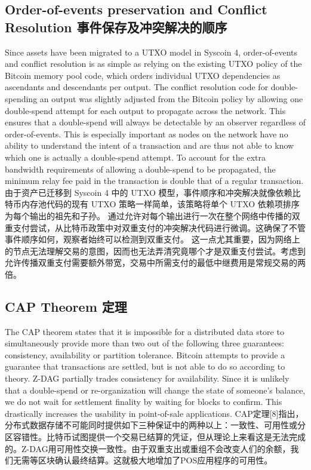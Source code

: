 \documentclass{ctexart}
\begin{document}
\subsection{Order-of-events preservation and Conflict Resolution 事件保存及冲突解决的顺序}
Since assets have been migrated to a UTXO model in Syscoin 4, order-of-events and conflict resolution is as simple as relying on the existing UTXO policy of the Bitcoin memory pool code, which orders individual UTXO dependencies as ascendants and descendants per output. The conflict resolution code for double-spending an output was slightly adjusted from the Bitcoin policy by allowing one double-spend attempt for each output to propagate across the network. This ensures that a double-spend will always be detectable by an observer regardless of order-of-events. This is especially important as nodes on the network have no ability to understand the intent of a transaction and are thus not able to know which one is actually a double-spend attempt. To account for the extra bandwidth requirements of allowing a double-spend to be propagated, the minimum relay fee paid in the transaction is double that of a regular transaction. 由于资产已迁移到 Syscoin 4 中的 UTXO 模型，事件顺序和冲突解决就像依赖比特币内存池代码的现有 UTXO 策略一样简单，该策略将单个 UTXO 依赖项排序为每个输出的祖先和子孙。 通过允许对每个输出进行一次在整个网络中传播的双重支付尝试，从比特币政策中对双重支付的冲突解决代码进行微调。这确保了不管事件顺序如何，观察者始终可以检测到双重支付。 这一点尤其重要，因为网络上的节点无法理解交易的意图，因而也无法弄清究竟哪个才是双重支付尝试。考虑到允许传播双重支付需要额外带宽，交易中所需支付的最低中继费用是常规交易的两倍。

\subsection{CAP Theorem 定理}
The CAP theorem \cite{Bre12} states that it is impossible for a distributed data store to simultaneously provide more than two out of the following three guarantees: consistency, availability or partition tolerance. Bitcoin attempts to provide a guarantee that transactions are settled, but is not able to do so according to theory. Z-DAG partially trades consistency for availability. Since it is unlikely that a double-spend or re-organization will change the state of someone’s balance, we do not wait for settlement finality by waiting for blocks to confirm. This drastically increases the usability in point-of-sale applications. CAP定理[8]指出，分布式数据存储不可能同时提供如下三种保证中的两种以上：一致性、可用性或分区容错性。比特币试图提供一个交易已结算的凭证，但从理论上来看这是无法完成的。Z-DAG用可用性交换一致性。由于双重支出或重组不会改变人们的余额，我们无需等区块确认最终结算。这就极大地增加了POS应用程序的可用性。
\end{document}

